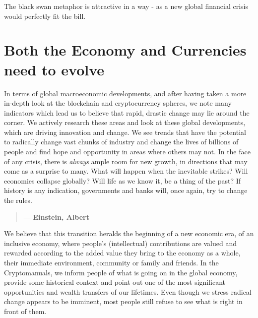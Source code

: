 The black swan metaphor is attractive in a way - as a new global financial crisis would perfectly fit the bill. 


\section*{Both the Economy and Currencies need to evolve}

In terms of global macroeconomic developments, and after having taken a more in-depth look at the blockchain and cryptocurrency spheres, we note many indicators which lead us to believe that rapid, drastic change may lie around the corner. We actively research these areas and look at these global developments, which are driving innovation and change. We see trends that have the potential to radically change vast chunks of industry and change the lives of billions of people and find hope and opportunity in areas where others may not. In the face of any crisis, there is \emph{always} ample room for new growth,  in directions that may come as a surprise to many. What will happen when the inevitable strikes? Will economies collapse globally? Will life as we know it, be a thing of the past? If history is any indication, governments and banks will, once again, try to change the rules. 

\begin{quotation}

  \textit{}
  \begin{flushright}
    \small{--- \textbf{Einstein, Albert}}
  \end{flushright}

\end{quotation}

We believe that this transition heralds the beginning of a new economic era, of an inclusive economy, where people's (intellectual) contributions are valued and rewarded according to the added value they bring to the economy as a whole, their immediate environment, community or family and friends. In the Cryptomanuals, we inform people of what is going on in the global economy, provide some historical context and point out one of the most significant opportunities and wealth transfers of our lifetimes. Even though we stress radical change appears to be imminent, most people still refuse to see what is right in front of them. 


